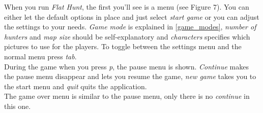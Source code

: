   When you run \emph{Flat Hunt}, the first you'll see is a menu (see Figure 7). You can either let the default options in place and just select \emph{start game} or you can adjust the settings to your needs. \emph{Game mode} is explained in \autoref{game_modes}, \emph{number of hunters} and \emph{map size} should be self-explanatory and \emph{characters} specifies which pictures to use for the players. To toggle between the settings menu and the normal menu press \emph{tab}.\\

  During the game when you press \emph{p}, the pause menu is shown. \emph{Continue} makes the pause menu disappear and lets you resume the game, \emph{new game} takes you to the start menu and \emph{quit} quits the application.\\

  The game over menu is similar to the pause menu, only there is no \emph{continue} in this one.
